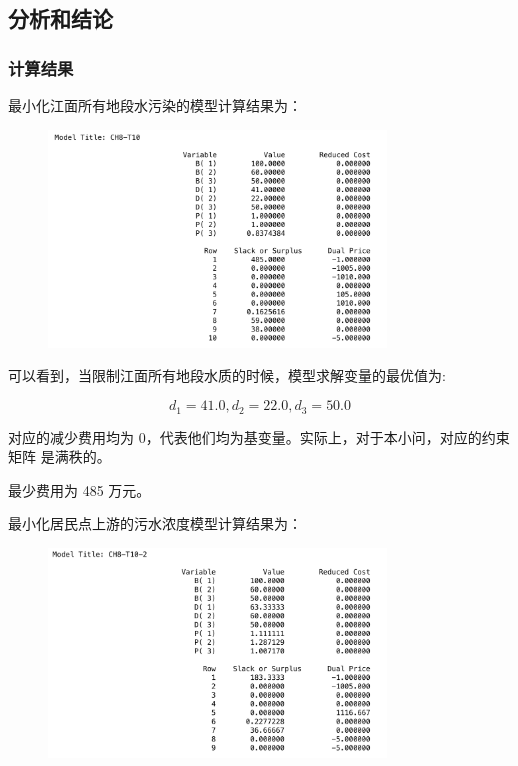 \documentclass{article}
\begin{document}
\subsection{分析和结论}

\subsubsection{计算结果}
最小化江面所有地段水污染的模型计算结果为：

\begin{figure}[H]
    \centering
    \includegraphics[width=0.8\textwidth]{pic1.png}
\end{figure}


可以看到，当限制江面所有地段水质的时候，模型求解变量的最优值为:


$$d_1=41.0,d_2=22.0,d_3=50.0$$

对应的减少费用均为 0，代表他们均为基变量。实际上，对于本小问，对应的约束矩阵 是满秩的。

最少费用为 485 万元。

最小化居民点上游的污水浓度模型计算结果为：

\begin{figure}[H]
    \centering
    \includegraphics[width=0.8\textwidth]{pic2.png}
\end{figure}
\end{document}
